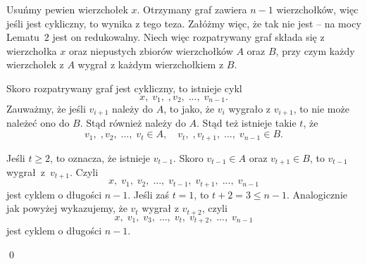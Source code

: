 \vspace{5px}


\noindent
Usuńmy pewien wierzchołek $x$. Otrzymany graf zawiera $n - 1$ wierzchołków, więc jeśli jest cykliczny, to wynika z tego teza. Załóżmy więc, że tak nie jest -- na mocy Lematu~$2$ jest on redukowalny. Niech więc rozpatrywany graf składa się z wierzchołka $x$ oraz niepustych zbiorów wierzchołków $A$ oraz $B$, przy czym każdy wierzchołek z $A$ wygrał z każdym wierzchołkiem z $B$.

\vspace{10px}
\noindent
Skoro rozpatrywany graf jest cykliczny, to istnieje cykl
\[
	x, \; v_1, \;, v_2, \; ...,\; v_{n - 1}.
\]
Zauważmy, że jeśli $v_{i + 1}$ należy do $A$, to jako, że $v_{i}$ wygrało z $v_{i + 1}$, to nie może należeć ono do $B$. Stąd również należy do $A$. Stąd też istnieje takie $t$, że
\[
	v_1, \;, v_2, \; ...,\; v_{t} \in A, \quad v_t, \;, v_{t + 1}, \; ...,\; v_{n - 1} \in B.
\]

\begin{center}
\end{center}

\noindent
Jeśli $t \geqslant 2$, to oznacza, że istnieje $v_{t - 1}$. Skoro $v_{t - 1} \in A$ oraz $v_{t + 1} \in B$, to $v_{t - 1}$ wygrał~z~$v_{t + 1}$. Czyli
\[
	x, \; v_1, \; v_2, \; ..., \; v_{t - 1}, \; v_{t + 1}, \; ..., \; v_{n - 1}
\]
jest cyklem o długości $n - 1$. Jeśli zaś $t = 1$, to $t + 2 = 3 \leqslant n - 1$. Analogicznie jak powyżej wykazujemy, że $v_{t}$ wygrał z $v_{t + 2}$, czyli
\[
	x, \; v_1, \; v_3, \; ..., \; v_{t}, \; v_{t + 2}, \; ..., \; v_{n - 1}
\]
jest cyklem o długości $n - 1$.

\qed
